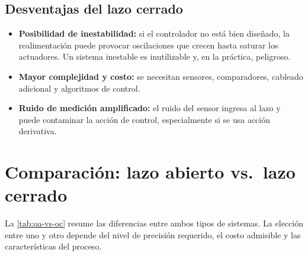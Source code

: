 \subsection{Desventajas del lazo cerrado}

\begin{itemize}
  \item \textbf{Posibilidad de inestabilidad:} si el controlador no está
    bien diseñado, la realimentación puede provocar oscilaciones que crecen
    hasta saturar los actuadores. Un sistema inestable es inutilizable y,
    en la práctica, peligroso.
  \item \textbf{Mayor complejidad y costo:} se necesitan sensores, comparadores,
    cableado adicional y algoritmos de control.
  \item \textbf{Ruido de medición amplificado:} el ruido del sensor ingresa
    al lazo y puede contaminar la acción de control, especialmente si se
    usa acción derivativa.
\end{itemize}

\section{Comparación: lazo abierto vs.\ lazo cerrado}
\label{sec:intro-comparacion}

La \cref{tab:oa-vs-oc} resume las diferencias entre ambos tipos de sistemas.
La elección entre uno y otro depende del nivel de precisión requerido, el
costo admisible y las características del proceso.

